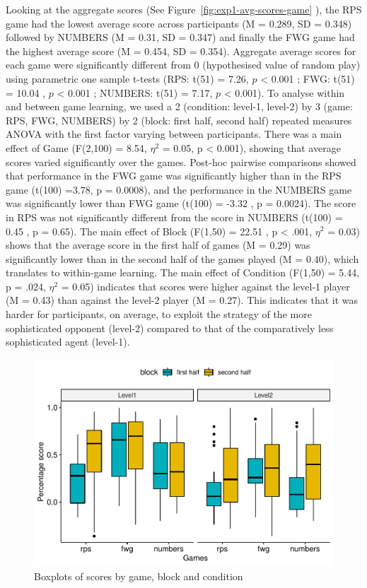 \documentclass[man,floatsintext]{apa6}
\begin{document}
Looking at the aggregate scores (See Figure~\ref{fig:exp1-avg-scores-game} ), the RPS game had the lowest average score across participants (M = 0.289, SD = 0.348) followed by NUMBERS (M = 0.31, SD = 0.347) and finally the FWG game had the highest average score (M = 0.454, SD = 0.354). Aggregate average scores for each game were significantly different from 0 (hypothesised value of random play) using parametric one sample t-tests (RPS: t(51) = 7.26, \(p\) \textless{} 0.001 ; FWG: t(51) = 10.04 , \(p\) \textless{} 0.001 ; NUMBERS: t(51) = 7.17, \(p\) \textless{} 0.001).
To analyse within and between game learning, we used a 2 (condition: level-1, level-2) by 3 (game: RPS, FWG, NUMBERS) by 2 (block: first half, second half) repeated measures ANOVA with the first factor varying between participants. There was a main effect of Game (F(2,100) = 8.54, \(\eta^{2}\) = 0.05, p \textless{} 0.001), showing that average scores varied significantly over the games. Post-hoc pairwise comparisons showed that performance in the FWG game was significantly higher than in the RPS game (t(100) =3.78, p = 0.0008), and the performance in the NUMBERS game was significantly lower than FWG game (t(100) = -3.32 , p = 0.0024). The score in RPS was not significantly different from the score in NUMBERS (t(100) = 0.45 , p = 0.65). The main effect of Block (F(1,50) = 22.51 , p \textless{} .001, \(\eta^{2}\) = 0.03) shows that the average score in the first half of games (M = 0.29) was significantly lower than in the second half of the games played (M = 0.40), which translates to within-game learning. The main effect of Condition (F(1,50) = 5.44, p = .024, \(\eta^{2}\) = 0.05) indicates that scores were higher against the level-1 player (M = 0.43) than against the level-2 player (M = 0.27). This indicates that it was harder for participants, on average, to exploit the strategy of the more sophisticated opponent (level-2) compared to that of the comparatively less sophisticated agent (level-1).

\begin{figure}

{\centering \includegraphics{draft_upgrade_v1_files/figure-latex/exp1-3factor-plot-1} 

}

\caption{Boxplots of scores by game, block and condition}\label{fig:exp1-3factor-plot}
\end{figure}
\end{document}
